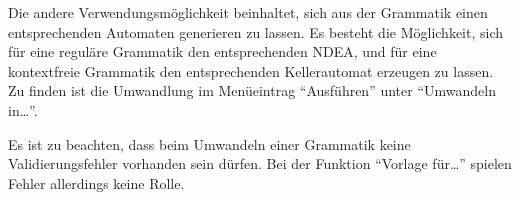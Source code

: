 Die andere Verwendungsmöglichkeit beinhaltet, sich aus der Grammatik einen
ent\-sprechen\-den Automaten generieren zu lassen. Es besteht die Möglichkeit,
sich für eine reguläre Grammatik den entsprechenden NDEA, und für eine
kontextfreie Grammatik den entsprechenden Kellerautomat erzeugen zu
lassen. Zu finden ist die Umwandlung im Menüeintrag "`Ausführen"'
unter "`Umwandeln in\ldots"'.\vspace{10pt}

Es ist zu beachten, dass beim Umwandeln einer Grammatik keine
Validierungsfehler vorhanden sein dürfen. Bei der Funktion "`Vorlage
für\ldots"' spielen Fehler allerdings keine Rolle.
